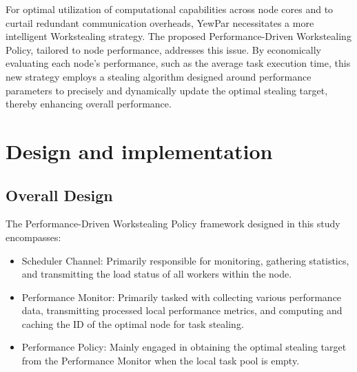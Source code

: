 \documentclass{mproj}
\begin{document}
For optimal utilization of computational capabilities across node cores and to curtail redundant communication overheads,
YewPar necessitates a more intelligent Workstealing strategy.
The proposed Performance-Driven Workstealing Policy, tailored to node performance,
addresses this issue.
By economically evaluating each node's performance, such as the average task execution time,
this new strategy employs a stealing algorithm designed around performance parameters
to precisely and dynamically update the optimal stealing target, thereby enhancing overall performance.


\chapter{Design and implementation}\label{design}

\section{Overall Design}

The Performance-Driven Workstealing Policy framework designed in this study encompasses:
\begin{itemize}
    \item Scheduler Channel: Primarily responsible for monitoring, gathering statistics,
          and transmitting the load status of all workers within the node.
    \item Performance Monitor: Primarily tasked with collecting various performance data,
          transmitting processed local performance metrics, and computing and caching the ID of
          the optimal node for task stealing.
    \item Performance Policy: Mainly engaged in obtaining the optimal stealing target from
          the Performance Monitor when the local task pool is empty.
\end{itemize}
\end{document}
